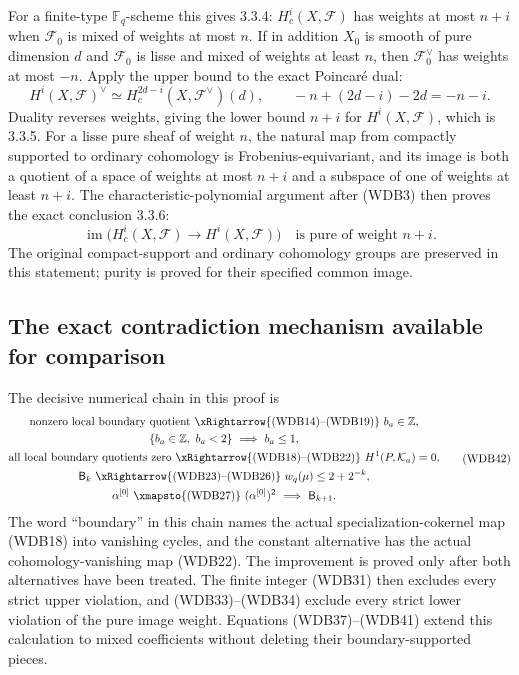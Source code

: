 For a finite-type \(\mathbb F_q\)-scheme this gives 3.3.4:
\(H_c^i(X,\mathcal F)\) has weights at most \(n+i\) when
\(\mathcal F_0\) is mixed of weights at most \(n\). If in
addition \(X_0\) is smooth of pure dimension \(d\) and
\(\mathcal F_0\) is lisse and mixed of weights at least \(n\),
then \(\mathcal F_0^\vee\) has weights at most \(-n\).
Apply the upper bound to the exact Poincar\'e dual:
\[
 H^i(X,\mathcal F)^\vee
 \simeq H_c^{2d-i}(X,\mathcal F^\vee)(d),
 \qquad
 -n+(2d-i)-2d=-n-i.
 \tag{WDB40}
\]
Duality reverses weights, giving the lower bound \(n+i\) for
\(H^i(X,\mathcal F)\), which is 3.3.5. For a lisse pure sheaf
of weight \(n\), the natural map from compactly supported to
ordinary cohomology is Frobenius-equivariant, and its image is both
a quotient of a space of weights at most \(n+i\) and a subspace
of one of weights at least \(n+i\). The characteristic-polynomial
argument after (WDB3) then proves the exact conclusion 3.3.6:
\[
 \operatorname{im}\bigl(H_c^i(X,\mathcal F)
                 \longrightarrow H^i(X,\mathcal F)\bigr)
 \quad\text{is pure of weight }n+i.
 \tag{WDB41}
\]
The original compact-support and ordinary cohomology groups are
preserved in this statement; purity is proved for their specified
common image.

\subsection{The exact contradiction mechanism available for comparison}

The decisive numerical chain in this proof is
\[
 \begin{gathered}
 \text{nonzero local boundary quotient}
 \ \xRightarrow{\text{(WDB14)--(WDB19)}}\ b_a\in\mathbb Z,\\
 \{b_a\in\mathbb Z,\ b_a<2\}
 \ \Longrightarrow\ b_a\le1,\\
 \text{all local boundary quotients zero}
 \ \xRightarrow{\text{(WDB18)--(WDB22)}}\ H^1(P,\mathcal K_a)=0,\\
 \mathsf B_k\ \xRightarrow{\text{(WDB23)--(WDB26)}}\
   w_q(\mu)\le2+2^{-k},\\
 \alpha^{[0]}\ \xmapsto{\text{(WDB27)}}\ (\alpha^{[0]})^2
 \ \Longrightarrow\ \mathsf B_{k+1}.
 \end{gathered}
 \tag{WDB42}
\]
The word ``boundary'' in this chain names the actual
specialization-cokernel map (WDB18) into vanishing cycles, and the
constant alternative has the actual cohomology-vanishing map
(WDB22). The improvement is proved only after both alternatives
have been treated. The finite integer (WDB31) then excludes every
strict upper violation, and (WDB33)--(WDB34) exclude every strict
lower violation of the pure image weight. Equations
(WDB37)--(WDB41) extend this calculation to mixed coefficients
without deleting their boundary-supported pieces.

